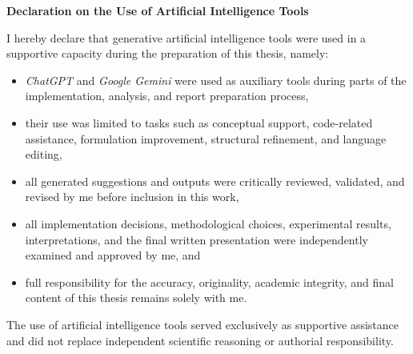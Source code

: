 {\Large
\noindent
{\bf Declaration on the Use of Artificial Intelligence Tools}} \\
\vspace*{0.3 cm}

\noindent
I hereby declare that generative artificial intelligence tools were used in a supportive capacity during the preparation of this thesis, namely:
\begin{itemize}
    \item[-] \textit{ChatGPT} and \textit{Google Gemini} were used as auxiliary tools during parts of the implementation, analysis, and report preparation process,
    \item[-] their use was limited to tasks such as conceptual support, code-related assistance, formulation improvement, structural refinement, and language editing,
    \item[-] all generated suggestions and outputs were critically reviewed, validated, and revised by me before inclusion in this work,
    \item[-] all implementation decisions, methodological choices, experimental results, interpretations, and the final written presentation were independently examined and approved by me, and
    \item[-] full responsibility for the accuracy, originality, academic integrity, and final content of this thesis remains solely with me.
\end{itemize}

\noindent
The use of artificial intelligence tools served exclusively as supportive assistance and did not replace independent scientific reasoning or authorial responsibility.\\\\\\\\

\noindent
\begin{table}[H]
\end{table}